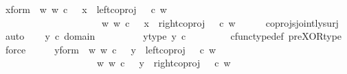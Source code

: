 \begin{isabellebody}
\ x{\isacharunderscore}{\kern0pt}form{\isacharcolon}{\kern0pt}\ {\isachardoublequoteopen}{\isacharparenleft}{\kern0pt}{\isasymexists}\ w{\isachardot}{\kern0pt}\ w\ {\isasymin}\isactrlsub c\ {\isasymone}\ {\isasymand}\ x\ {\isacharequal}{\kern0pt}\ left{\isacharunderscore}{\kern0pt}coproj\ {\isasymone}\ {\isasymone}\ {\isasymcirc}\isactrlsub c\ w{\isacharparenright}{\kern0pt}\isanewline
\ \ \ \ \ \ \ \ \ \ \ \ \ \ \ \ \ \ {\isasymor}\ \ {\isacharparenleft}{\kern0pt}{\isasymexists}\ w{\isachardot}{\kern0pt}\ w\ {\isasymin}\isactrlsub c\ {\isasymone}\ {\isasymand}\ x\ {\isacharequal}{\kern0pt}\ right{\isacharunderscore}{\kern0pt}coproj\ {\isasymone}\ {\isasymone}\ {\isasymcirc}\isactrlsub c\ w{\isacharparenright}{\kern0pt}{\isachardoublequoteclose}\isanewline
\ \ \ \ \isamarkupfalse%
\ coprojs{\isacharunderscore}{\kern0pt}jointly{\isacharunderscore}{\kern0pt}surj\ \isamarkupfalse%
\ auto\isanewline
\isanewline
\ \ \isamarkupfalse%
\ {\isachardoublequoteopen}y\ {\isasymin}\isactrlsub c\ domain\ {\isacharparenleft}{\kern0pt}{\isasymlangle}{\isasymt}{\isacharcomma}{\kern0pt}{\isasymf}{\isasymrangle}\ {\isasymamalg}\ {\isasymlangle}{\isasymf}{\isacharcomma}{\kern0pt}{\isasymt}{\isasymrangle}{\isacharparenright}{\kern0pt}{\isachardoublequoteclose}\ \isanewline
\ \ \isamarkupfalse%
\ \isamarkupfalse%
\ y{\isacharunderscore}{\kern0pt}type{\isacharcolon}{\kern0pt}\ {\isachardoublequoteopen}y\ {\isasymin}\isactrlsub c\ {\isasymone}{\isasymCoprod}{\isasymone}{\isachardoublequoteclose}\ \ \isanewline
\ \ \ \ \isamarkupfalse%
\ cfunc{\isacharunderscore}{\kern0pt}type{\isacharunderscore}{\kern0pt}def\ pre{\isacharunderscore}{\kern0pt}XOR{\isacharunderscore}{\kern0pt}type\ \isamarkupfalse%
\ force\isanewline
\ \ \isamarkupfalse%
\ \isamarkupfalse%
\ y{\isacharunderscore}{\kern0pt}form{\isacharcolon}{\kern0pt}\ {\isachardoublequoteopen}{\isacharparenleft}{\kern0pt}{\isasymexists}\ w{\isachardot}{\kern0pt}\ w\ {\isasymin}\isactrlsub c\ {\isasymone}\ {\isasymand}\ y\ {\isacharequal}{\kern0pt}\ left{\isacharunderscore}{\kern0pt}coproj\ {\isasymone}\ {\isasymone}\ {\isasymcirc}\isactrlsub c\ w{\isacharparenright}{\kern0pt}\isanewline
\ \ \ \ \ \ \ \ \ \ \ \ \ \ \ \ \ {\isasymor}\ \ {\isacharparenleft}{\kern0pt}{\isasymexists}\ w{\isachardot}{\kern0pt}\ w\ {\isasymin}\isactrlsub c\ {\isasymone}\ {\isasymand}\ y\ {\isacharequal}{\kern0pt}\ right{\isacharunderscore}{\kern0pt}coproj\ {\isasymone}\ {\isasymone}\ {\isasymcirc}\isactrlsub c\ w{\isacharparenright}{\kern0pt}{\isachardoublequoteclose}\isanewline

\end{isabellebody}
